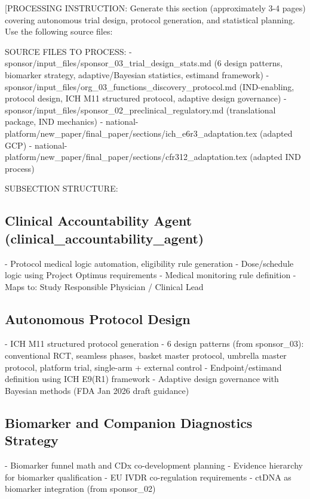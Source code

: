 
[PROCESSING INSTRUCTION: Generate this section (approximately 3-4 pages) covering autonomous
trial design, protocol generation, and statistical planning. Use the following source files:

SOURCE FILES TO PROCESS:
- sponsor/input\_files/sponsor\_03\_trial\_design\_stats.md (6 design patterns, biomarker strategy,
  adaptive/Bayesian statistics, estimand framework)
- sponsor/input\_files/org\_03\_functions\_discovery\_protocol.md (IND-enabling, protocol design,
  ICH M11 structured protocol, adaptive design governance)
- sponsor/input\_files/sponsor\_02\_preclinical\_regulatory.md (translational package, IND mechanics)
- national-platform/new\_paper/final\_paper/sections/ich\_e6r3\_adaptation.tex (adapted GCP)
- national-platform/new\_paper/final\_paper/sections/cfr312\_adaptation.tex (adapted IND process)

SUBSECTION STRUCTURE:

\subsection{Clinical Accountability Agent (clinical\_accountability\_agent)}
- Protocol medical logic automation, eligibility rule generation
- Dose/schedule logic using Project Optimus requirements
- Medical monitoring rule definition
- Maps to: Study Responsible Physician / Clinical Lead

\subsection{Autonomous Protocol Design}
- ICH M11 structured protocol generation
- 6 design patterns (from sponsor\_03): conventional RCT, seamless phases,
  basket master protocol, umbrella master protocol, platform trial, single-arm + external control
- Endpoint/estimand definition using ICH E9(R1) framework
- Adaptive design governance with Bayesian methods (FDA Jan 2026 draft guidance)

\subsection{Biomarker and Companion Diagnostics Strategy}
- Biomarker funnel math and CDx co-development planning
- Evidence hierarchy for biomarker qualification
- EU IVDR co-regulation requirements
- ctDNA as biomarker integration (from sponsor\_02)

